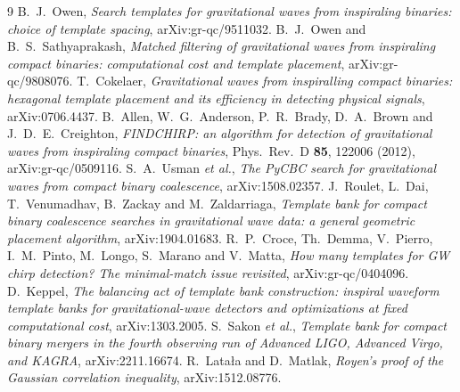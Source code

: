 \documentclass[10pt,a4paper]{article}
\begin{document}
\clearpage
\begin{thebibliography}{9}
\small
{} B.~J.~Owen, \emph{Search templates for gravitational waves from
  inspiraling binaries: choice of template spacing}, arXiv:gr-qc/9511032.
 B.~J.~Owen and B.~S.~Sathyaprakash, \emph{Matched filtering of
  gravitational waves from inspiraling compact binaries: computational cost and template
  placement}, arXiv:gr-qc/9808076.
 T.~Cokelaer, \emph{Gravitational waves from inspiralling compact
  binaries: hexagonal template placement and its efficiency in detecting physical
  signals}, arXiv:0706.4437.
 B.~Allen, W.~G.~Anderson, P.~R.~Brady, D.~A.~Brown and
  J.~D.~E.~Creighton, \emph{FINDCHIRP: an algorithm for detection of gravitational waves
  from inspiraling compact binaries}, Phys.\ Rev.\ D \textbf{85}, 122006 (2012),
  arXiv:gr-qc/0509116.
 S.~A.~Usman \emph{et al.}, \emph{The PyCBC search for gravitational
  waves from compact binary coalescence}, arXiv:1508.02357.
 J.~Roulet, L.~Dai, T.~Venumadhav, B.~Zackay and M.~Zaldarriaga,
  \emph{Template bank for compact binary coalescence searches in gravitational wave data:
  a general geometric placement algorithm}, arXiv:1904.01683.
 R.~P.~Croce, Th.~Demma, V.~Pierro, I.~M.~Pinto, M.~Longo, S.~Marano
  and V.~Matta, \emph{How many templates for GW chirp detection? The minimal-match issue
  revisited}, arXiv:gr-qc/0404096.
 D.~Keppel, \emph{The balancing act of template bank construction:
  inspiral waveform template banks for gravitational-wave detectors and optimizations at
  fixed computational cost}, arXiv:1303.2005.
 S.~Sakon \emph{et al.}, \emph{Template bank for compact binary mergers
  in the fourth observing run of Advanced LIGO, Advanced Virgo, and KAGRA},
  arXiv:2211.16674.
 R.~Lata{\l}a and D.~Matlak, \emph{Royen's proof of the Gaussian
  correlation inequality}, arXiv:1512.08776.
\end{thebibliography}
\end{document}
